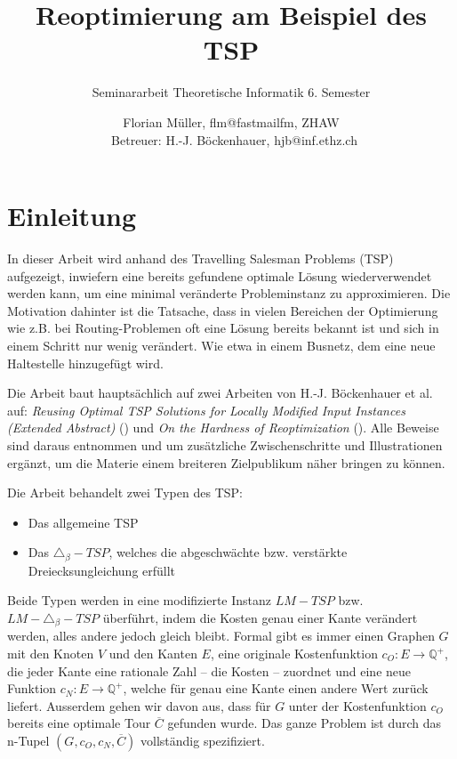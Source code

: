 \documentclass[a4paper,11pt]{scrreprt}
\title{Reoptimierung am Beispiel des TSP}
\subtitle{Seminararbeit Theoretische Informatik 6. Semester}
\author{Florian Müller, flm@fastmailfm, ZHAW\\\
Betreuer: H.-J. Böckenhauer, hjb@inf.ethz.ch}
\date{}
\begin{document}
\maketitle

\tableofcontents

\chapter{Einleitung}

In dieser Arbeit wird anhand des Travelling Salesman Problems (TSP) aufgezeigt, inwiefern eine bereits gefundene optimale Lösung wiederverwendet werden kann, um eine minimal veränderte Probleminstanz zu approximieren. Die Motivation dahinter ist die Tatsache, dass in vielen Bereichen der Optimierung wie z.B. bei Routing-Problemen oft eine Lösung bereits bekannt ist und sich in einem Schritt nur wenig verändert. Wie etwa in einem Busnetz, dem eine neue Haltestelle hinzugefügt wird. 

Die Arbeit baut hauptsächlich auf zwei Arbeiten von H.-J. Böckenhauer et al. auf: \emph{Reusing Optimal TSP Solutions for Locally Modified Input Instances (Extended Abstract)} (\cite{bok1}) und \emph{On the Hardness of Reoptimization} (\cite{bok2}). Alle Beweise sind daraus entnommen und um zusätzliche Zwischenschritte und Illustrationen ergänzt, um die Materie einem breiteren Zielpublikum näher bringen zu können.

Die Arbeit behandelt zwei Typen des TSP:

\begin{itemize}
\item Das allgemeine TSP
\item Das $\triangle_{\beta}-TSP$, welches die abgeschwächte bzw. verstärkte Dreiecksungleichung erfüllt
\end{itemize}

Beide Typen werden in eine modifizierte Instanz $LM -TSP$ bzw. $LM - \triangle_{\beta}-TSP$ überführt, indem die Kosten genau einer Kante verändert werden, alles andere jedoch gleich bleibt. Formal gibt es immer einen Graphen $G$ mit den Knoten $V$ und den Kanten $E$, eine originale Kostenfunktion $c_O: E \rightarrow \mathbb{Q}^+$, die jeder Kante eine rationale Zahl -- die Kosten -- zuordnet und eine neue Funktion $c_N: E \rightarrow \mathbb{Q}^+$, welche für genau eine Kante einen andere Wert zurück liefert. Ausserdem gehen wir davon aus, dass für $G$ unter der Kostenfunktion $c_O$ bereits eine optimale Tour $\overline{C}$ gefunden wurde. Das ganze Problem ist durch das n-Tupel $(G, c_O, c_N, \overline{C})$ vollständig spezifiziert.
\end{document}
